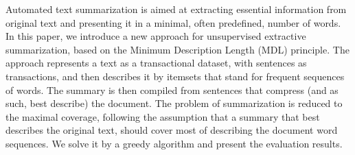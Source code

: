 Automated text summarization is aimed at extracting essential information from original text and presenting it in a minimal, often predefined, number of words. In this paper, we introduce a new approach for unsupervised extractive summarization, based on the Minimum Description Length (MDL) principle. The approach represents a text as a transactional dataset, with sentences as transactions, and then describes it by itemsets that stand for frequent sequences of words. The summary is then compiled from sentences that compress (and as such, best describe) the document. The problem of summarization is reduced to the maximal coverage, following the assumption that a summary that best describes the original text, should cover most of describing the document word sequences. We solve it by a greedy algorithm and present the evaluation results.
